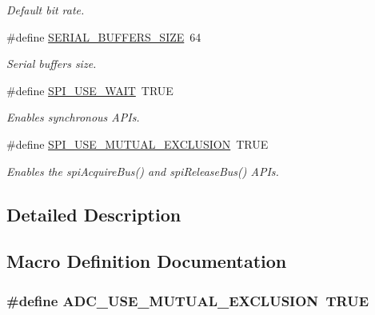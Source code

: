 \begin{DoxyCompactItemize}
\begin{DoxyCompactList}\small\item\em Default bit rate. \end{DoxyCompactList}\item 
\#define \hyperlink{group__HAL__CONF_ga81a9fb00c7a1ce0fe70f263d8fd820e8}{S\+E\+R\+I\+A\+L\+\_\+\+B\+U\+F\+F\+E\+R\+S\+\_\+\+S\+I\+Z\+E}~64
\begin{DoxyCompactList}\small\item\em Serial buffers size. \end{DoxyCompactList}\item 
\#define \hyperlink{group__HAL__CONF_ga0c9ab1488423fa10a22f506c6e74b563}{S\+P\+I\+\_\+\+U\+S\+E\+\_\+\+W\+A\+I\+T}~T\+R\+U\+E
\begin{DoxyCompactList}\small\item\em Enables synchronous A\+P\+Is. \end{DoxyCompactList}\item 
\#define \hyperlink{group__HAL__CONF_ga36d1818f9631f955f7cc94629b1d5498}{S\+P\+I\+\_\+\+U\+S\+E\+\_\+\+M\+U\+T\+U\+A\+L\+\_\+\+E\+X\+C\+L\+U\+S\+I\+O\+N}~T\+R\+U\+E
\begin{DoxyCompactList}\small\item\em Enables the {\ttfamily spi\+Acquire\+Bus()} and {\ttfamily spi\+Release\+Bus()} A\+P\+Is. \end{DoxyCompactList}\end{DoxyCompactItemize}


\subsection{Detailed Description}


\subsection{Macro Definition Documentation}
\hypertarget{group__HAL__CONF_gac0893cb47e338c2dabad34b974a0a88d}{}
\subsubsection[{A\+D\+C\+\_\+\+U\+S\+E\+\_\+\+M\+U\+T\+U\+A\+L\+\_\+\+E\+X\+C\+L\+U\+S\+I\+O\+N}]{\setlength{\rightskip}{0pt plus 5cm}\#define A\+D\+C\+\_\+\+U\+S\+E\+\_\+\+M\+U\+T\+U\+A\+L\+\_\+\+E\+X\+C\+L\+U\+S\+I\+O\+N~T\+R\+U\+E}\label{group__HAL__CONF_gac0893cb47e338c2dabad34b974a0a88d}


